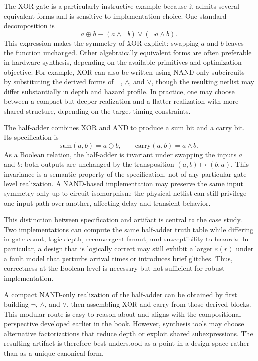 \documentclass[11pt]{article}
\begin{document}
The XOR gate is a particularly instructive example because it admits several equivalent forms and is sensitive to implementation choice. One standard decomposition is
\[
 a \oplus b \equiv (a \wedge \neg b) \vee (\neg a \wedge b).
\]
This expression makes the symmetry of XOR explicit: swapping \(a\) and \(b\) leaves the function unchanged. Other algebraically equivalent forms are often preferable in hardware synthesis, depending on the available primitives and optimization objective. For example, XOR can also be written using NAND-only subcircuits by substituting the derived forms of \(\neg\), \(\wedge\), and \(\vee\), though the resulting netlist may differ substantially in depth and hazard profile. In practice, one may choose between a compact but deeper realization and a flatter realization with more shared structure, depending on the target timing constraints.

The half-adder combines XOR and AND to produce a sum bit and a carry bit. Its specification is
\[
\mathrm{sum}(a,b) = a \oplus b,
\qquad
\mathrm{carry}(a,b) = a \wedge b.
\]
As a Boolean relation, the half-adder is invariant under swapping the inputs \(a\) and \(b\): both outputs are unchanged by the transposition \((a,b) \mapsto (b,a)\). This invariance is a semantic property of the specification, not of any particular gate-level realization. A NAND-based implementation may preserve the same input symmetry only up to circuit isomorphism; the physical netlist can still privilege one input path over another, affecting delay and transient behavior.

This distinction between specification and artifact is central to the case study. Two implementations can compute the same half-adder truth table while differing in gate count, logic depth, reconvergent fanout, and susceptibility to hazards. In particular, a design that is logically correct may still exhibit a larger \(\varepsilon(r)\) under a fault model that perturbs arrival times or introduces brief glitches. Thus, correctness at the Boolean level is necessary but not sufficient for robust implementation.

A compact NAND-only realization of the half-adder can be obtained by first building \(\neg\), \(\wedge\), and \(\vee\), then assembling XOR and carry from those derived blocks. This modular route is easy to reason about and aligns with the compositional perspective developed earlier in the book. However, synthesis tools may choose alternative factorizations that reduce depth or exploit shared subexpressions. The resulting artifact is therefore best understood as a point in a design space rather than as a unique canonical form.
\end{document}

